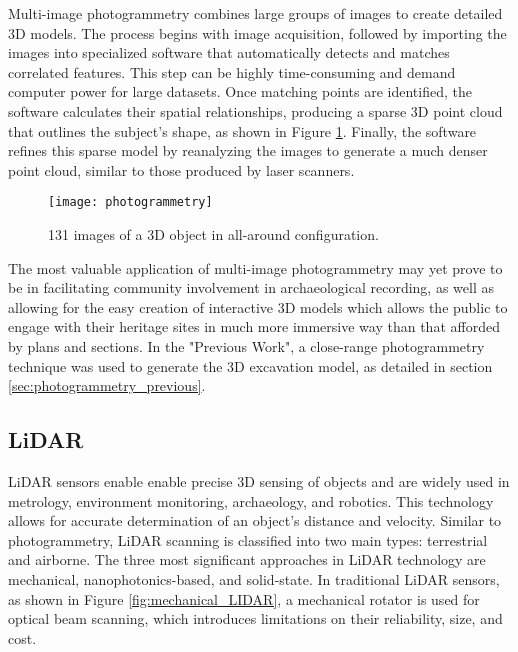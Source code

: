 Multi-image photogrammetry combines large groups of images to create detailed 3D models. The process begins with image acquisition, followed by importing 
the images into specialized software that automatically detects and matches correlated features. This step can be highly time-consuming and demand computer power for large datasets. 
Once matching points are identified, the software calculates their spatial relationships, producing a sparse \gls{3D} point cloud that outlines the subject’s shape, as shown in Figure \ref{fig:photo2}. 
Finally, the software refines this sparse model by reanalyzing the images to generate a much denser point cloud, similar to those produced by laser scanners.~\cite{mccarthy2014multi}

\begin{figure}[h!]
    \centering
    \texttt{[image: photogrammetry]}
    \caption{131 images of a \gls{3D} object in all-around configuration.~\cite{luhmann2016sensor}}
    \label{fig:photo2}
\end{figure} 
\FloatBarrier

 
  
The most valuable application of multi-image photogrammetry
may yet prove to be in facilitating community involvement in
archaeological recording, as well as allowing for the easy creation of
interactive \gls{3D} models which allows the public to
engage with their heritage sites in much more immersive way than
that afforded by plans and sections. In the "Previous Work", a close-range photogrammetry technique was used to generate the \gls{3D} excavation model, as detailed in section \ref{sec:photogrammetry_previous}.

\subsection{LiDAR}
\label{sec:lidar}

\gls{LiDAR} sensors enable  enable precise 3D sensing of objects and are widely used in metrology, environment monitoring, archaeology, and robotics.
This technology allows for accurate determination of an object’s distance and velocity. 
Similar to photogrammetry, \gls{LiDAR} scanning is classified into two main types: terrestrial and airborne.
The three most significant approaches in \gls{LiDAR} technology are mechanical, nanophotonics-based, and solid-state.
In traditional \gls{LiDAR} sensors, as shown in Figure \ref{fig:mechanical_LIDAR}, a mechanical rotator is used for optical beam scanning, which introduces limitations on their reliability, size, and cost.~\cite{li2022progress}

